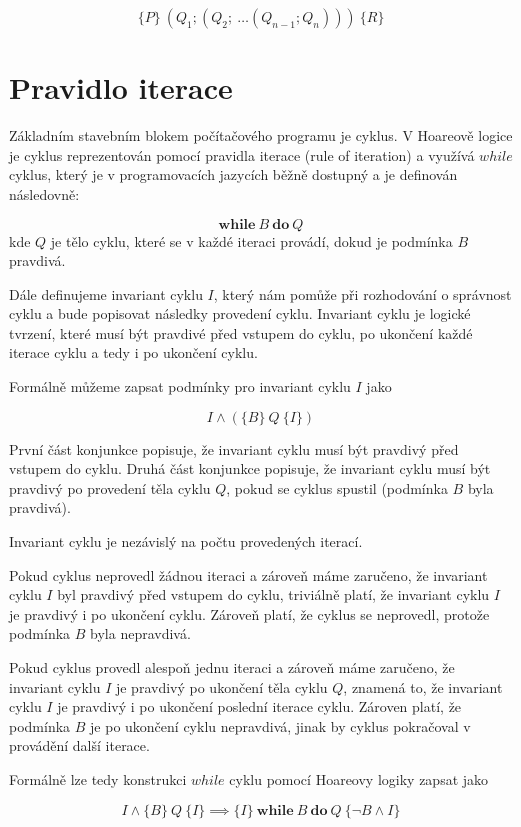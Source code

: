 \begin{equation*}
    \{ P \} \  (Q_1; (Q_2; \  \ldots (Q_{n-1}; Q_n))) \  \{ R \}
\end{equation*}

\section{Pravidlo iterace}
\label{sec:hoare-pravidlo-iterace}

Základním stavebním blokem počítačového programu je cyklus.
V Hoareově logice je cyklus reprezentován pomocí pravidla iterace (rule of iteration)
a využívá $while$ cyklus, který je v programovacích jazycích běžně dostupný a je definován následovně:

\begin{equation*}
    \textbf{while} \  B \  \textbf{do} \  Q
\end{equation*}
kde $Q$ je tělo cyklu, které se v každé iteraci provádí, dokud je podmínka $B$ pravdivá.

Dále definujeme invariant cyklu $I$, který nám pomůže
při rozhodování o správnost cyklu a bude popisovat následky provedení cyklu.
Invariant cyklu je logické tvrzení, které musí být pravdivé před vstupem do cyklu,
po ukončení každé iterace cyklu a tedy i po ukončení cyklu.

Formálně můžeme zapsat podmínky pro invariant cyklu $I$ jako

\begin{equation*}
    I \land (\{ B \} \  Q \  \{ I \})
\end{equation*}

První část konjunkce popisuje, že invariant cyklu musí být pravdivý před vstupem do cyklu.
Druhá část konjunkce popisuje, že invariant cyklu musí být pravdivý po provedení těla cyklu $Q$,
pokud se cyklus spustil (podmínka $B$ byla pravdivá).

\begin{remark}
    Invariant cyklu je nezávislý na počtu provedených iterací.
\end{remark}

Pokud cyklus neprovedl žádnou iteraci a zároveň máme zaručeno,
že invariant cyklu $I$ byl pravdivý před vstupem do cyklu,
triviálně platí, že invariant cyklu $I$ je pravdivý i po ukončení cyklu.
Zároveň platí, že cyklus se neprovedl, protože podmínka $B$ byla nepravdivá.

Pokud cyklus provedl alespoň jednu iteraci a zároveň máme zaručeno,
že invariant cyklu $I$ je pravdivý po ukončení těla cyklu $Q$,
znamená to, že invariant cyklu $I$ je pravdivý i po ukončení poslední iterace cyklu.
Zároven platí, že podmínka $B$ je po ukončení cyklu nepravdivá, jinak by cyklus pokračoval v provádění další iterace.

Formálně lze tedy konstrukci $while$ cyklu pomocí Hoareovy logiky zapsat jako

\begin{equation*}
    I \land \{ B \} \  Q \  \{ I \} \implies \{ I \} \  \textbf{while} \  B \  \textbf{do} \  Q \  \{ \neg B \land I \}
\end{equation*}
